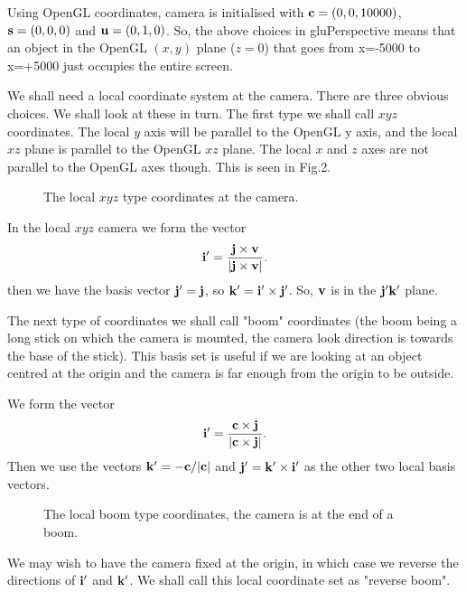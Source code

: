 \documentclass[12pt]{article}
\begin{document}
Using OpenGL coordinates,  camera is initialised with 
${\bf c}=(0, 0, 10000)$, ${\bf s}=(0, 0, 0)$ and
${\bf u}=(0,1,0)$. So, the above  choices in gluPerspective
means that an object in the OpenGL $(x,y)$ plane ($z=0$)
that goes from x=-5000 to x=+5000 just occupies the entire
 screen.

We shall need a local coordinate system at the camera. There are three
obvious choices. We shall look at these in turn. The first type
we shall call $xyz$ coordinates. The local $y$ axis will be parallel to the
OpenGL y axis, and the local $xz$ plane is parallel to the OpenGL $xz$ plane.
The local $x$ and $z$ axes are not parallel to the OpenGL axes though.
This is seen in Fig.2.
\begin{figure}[htb]
\vspace*{10cm}
\caption{ 
The local $xyz$ type coordinates at the camera.
}
\end{figure}
In the local $xyz$ camera we form the vector
\begin{equation}
{\bf i}^\prime=\frac{{\bf j} \times {\bf v}}
                     {\vert {\bf j} \times {\bf v} \vert }.
\end{equation}
then we have  the basis vector ${\bf j}^\prime=\bf j$, so
${\bf k}^\prime={\bf i}^\prime \times {\bf j}^\prime$. So, 
${\bf v}$ is in the $\bf j^\prime  k^\prime$ plane.

The next type of coordinates we shall call "boom" coordinates
(the boom being a long stick on which the camera is mounted,
the camera look direction is towards the base of the stick).
This basis set is useful if we are looking at an object
centred at the origin and the camera is far enough
from the origin to be outside.

We form the vector 
\begin{equation}
{\bf i}^\prime=\frac{{\bf c} \times {\bf j}}
                     {\vert {\bf c} \times {\bf j} \vert }.
\end{equation}
Then we use the vectors ${\bf k}^\prime=-{\bf c} / \vert {\bf c} \vert$ and
 ${\bf j}^\prime={\bf k}^\prime \times {\bf i}^\prime$ as the other two
local basis vectors.
\begin{figure}[htb]
\vspace*{10cm}
\caption{ 
The local boom type coordinates,  the camera is  at the end of a boom.
}
\end{figure}
We may wish to have the camera fixed at the origin, in which case 
we reverse the directions of ${\bf i}^\prime$ and ${\bf k}^\prime$.
We shall call this local coordinate set as "reverse boom".
\end{document}
